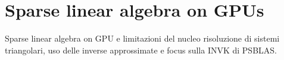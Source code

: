  \section{Sparse linear algebra on GPUs}
 Sparse linear algebra on GPU e limitazioni del nucleo risoluzione di sistemi triangolari, uso delle inverse approssimate e focus sulla INVK di PSBLAS.

